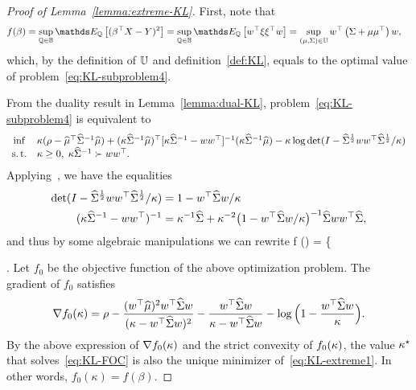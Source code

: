 \documentclass{article}
\begin{document}
\begin{proof}[Proof of Lemma~\ref{lemma:extreme-KL}]
    First, note that
    \begin{align*}
        f(\beta) & = \Sup{\QQ \in \mbb B} \EE_\QQ\left[(\beta^\top X - Y)^2 \right] = \Sup{\QQ \in \mbb B} \EE_\QQ \left[w^\top \xi \xi^\top w \right] = \Sup{ (\m, \cov) \in {\mbb U} } w^\top \left( \cov + \m\m^\top  \right) w ,
    \end{align*}
    which, by the definition of $\mathbb U$ and definition~\eqref{def:KL}, equals to the optimal value of problem~\eqref{eq:KL-subproblem4}.

    From the duality result in Lemma~\ref{lemma:dual-KL}, problem~\eqref{eq:KL-subproblem4} is equivalent to
    \[
	\begin{array}{cl}
	\inf &\kappa (\rho - \widehat {\mu}^\top \widehat{\Sigma}^{-1} \widehat {\mu} ) + (\kappa \widehat{\Sigma}^{-1} \widehat {\mu})^\top [\kappa \widehat{\Sigma}^{-1} - ww^\top]^{-1} ( \kappa \widehat{\Sigma}^{-1} \widehat {\mu} ) - \kappa \log \det (I - \widehat{\Sigma}^{\frac{1}{2}} ww^\top \widehat{\Sigma}^{\frac{1}{2}} / \kappa) \\
	\operatorname{s.t.} & \kappa \ge 0, \; \kappa \widehat{\Sigma}^{-1} \succ ww^\top.
	\end{array}
	\]
	Applying~\citet[Fact~2.16.3]{ref:bernstein2009matrix}, we have the equalities
	\begin{align*}
	     \det (I - \widehat{\Sigma}^{\frac{1}{2}} ww^\top \widehat{\Sigma}^{\frac{1}{2}} / \kappa) &= 1 - w^\top \widehat{\Sigma} w/\kappa \\
	     (\kappa \widehat{\Sigma}^{-1} - ww^\top)^{-1} &= \kappa^{-1} \widehat{\Sigma} + \kappa^{-2} \big( 1 - w^\top \widehat{\Sigma} w/\kappa \big)^{-1} \widehat{\Sigma} w w^\top \widehat{\Sigma},
	\end{align*}
	and thus by some algebraic manipulations we can rewrite
	\be \label{eq:KL-extreme1}
	    f (\beta) =  \left\{
	\begin{array}{cl}
	\inf &\dualvar \rho  +  - \dualvar \log \big( 1 - w^\top \covsa w/\dualvar \big) \\
	\st & \dualvar > w^\top \covsa w.
	\end{array}
	\right.
	\ee
	Let $f_0$ be the objective function of the above optimization problem. The gradient of $f_0$ satisfies
	\[
	    \nabla f_0(\kappa) = \rho - \frac{(w^\top \widehat {\mu})^2 w^\top \widehat{\Sigma} w}{(\kappa - w^\top \widehat{\Sigma} w)^2} - \frac{w^\top \widehat{\Sigma} w}{\kappa - w^\top \widehat{\Sigma} w} - \log\Big( 1 - \frac{w^\top \widehat{\Sigma} w}{\kappa}\Big).
	\]
	By the above expression of $\nabla f_0 (\kappa)$ and the strict convexity of $f_0 (\kappa)$, the value $\kappa^\star$ that solves~\eqref{eq:KL-FOC} is also the unique minimizer of~\eqref{eq:KL-extreme1}. In other words, $f_0 (\kappa) = f(\beta)$.
	

\end{proof}
\end{document}
